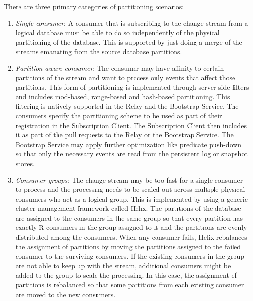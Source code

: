 There are three primary categories of partitioning scenarios:
\begin{enumerate}
\item\emph{Single consumer}: A consumer that is subscribing to the change stream from a logical database must be able to do so independently of the physical partitioning of the database. This is supported by just doing a merge of the streams emanating from the source database partitions.
\item\emph{Partition-aware consumer}: The consumer may have affinity to certain partitions of the stream and want to process only events that affect those partitions. This form of partitioning is implemented through server-side filters and includes mod-based, range-based and hash-based partitioning.  This filtering is natively supported in the Relay and the Bootstrap Service.  The consumers specify the partitioning scheme to be used as part of their registration in the Subscription Client. The Subscription Client then includes it as part of the pull requests to the Relay or the Bootstrap Service. The Bootstrap Service may apply further optimization like predicate push-down so that only the necessary events are read from the persistent log or snapshot stores.
\item\emph{Consumer groups}: The change stream may be too fast for a single consumer to process and the processing needs to be scaled out across multiple physical consumers who act as a logical group. This is implemented by using a generic cluster management framework called Helix. The partitions of the database are assigned to the consumers in the same group so that every partition has exactly R consumers in the group assigned to it and the partitions are evenly distributed among the consumers. When any consumer fails, Helix rebalances the assignment of partitions by moving the partitions assigned to the failed consumer to the surviving consumers. If the existing consumers in the group are not able to keep up with the stream, additional consumers might be added to the group to scale the processing. In this case, the assignment of partitions is rebalanced so that some partitions from each existing consumer are moved to the new consumers. 
\end{enumerate}


